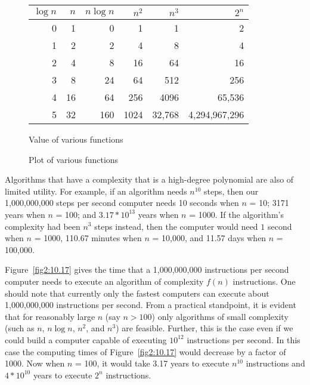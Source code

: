 \begin{figure}
\begin{center}
\begin{tabular}{|r ||r|| r r r r|}
$\log n$ & $n$ & $n \log n$ & $n^2$ & $n^3$ & $2^n$\\ \hline
0 & 1 & 0 & 1 & 1 & 2\\
1 & 2 & 2 & 4 & 8 & 4\\
2 & 4 & 8 & 16 & 64 & 16\\
3 & 8 & 24 & 64 & 512 & 256\\
4 & 16 & 64 & 256 & 4096 & 65,536\\
5 & 32 & 160 & 1024 & 32,768 & 4,294,967,296\\ 
\end{tabular}
\end{center}
\caption{Value of various functions
\label{fig2:10.16}}
\end{figure}

\begin{figure}
\centerline{\protect{}}
\caption{Plot of various functions
\label{fig2:10.3}}
\end{figure}

 
Algorithms that have a complexity that is a high-degree polynomial
are also of limited utility.  For example, if an algorithm needs
$n^{10}$ steps, then our 1,000,000,000 steps
per second computer needs 10 seconds when $n$ = 10; 3171 years
when $n$ = 100; and $3.17 * 10^{13}$ years
when $n$ = 1000.  If the algorithm's complexity had been
$n^3$ steps instead, then the computer would need $1$ second
when $n$ = 1000, 110.67 minutes when $n$ = 10,000,
and 11.57 days when $n$ = 100,000.

 
Figure~\ref{fig2:10.17} gives the time that a 1,000,000,000 instructions per second
computer needs to execute an
algorithm of complexity $f(n)$ instructions.  One
should note that currently only the fastest computers can execute about
1,000,000,000
instructions per second.
From a practical standpoint, it is evident that for reasonably large
$n$ (say $n > 100$) only algorithms of small complexity (such as $n$, $n \log n$,
$n^2$, and $n^3$) are feasible.  Further, this
is the case even if we could build a computer capable of executing
$10^{12}$ instructions per second.
In this case the computing times of Figure~\ref{fig2:10.17} would decrease
by a factor of 1000.  Now when $n$ = 100, it would take 3.17 years
to execute $n^{10}$
instructions and $4 * 10^{10}$ years to execute $2^n$ instructions.


